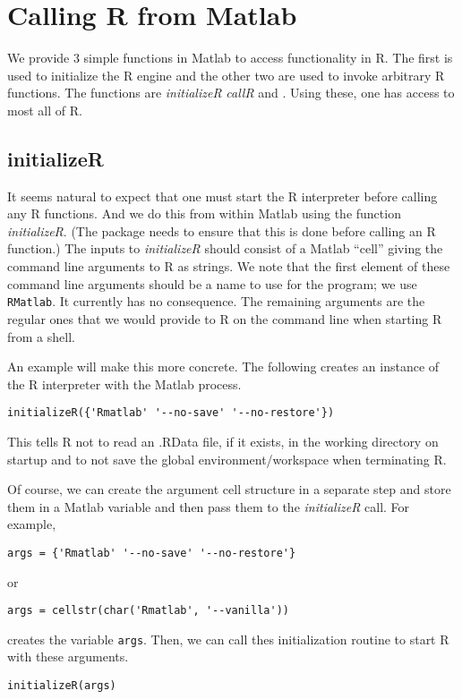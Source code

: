 \documentclass{article}
\def\MatlabFun#1{\textsl{#1}}
\begin{document}
\section{Calling R from Matlab}

We provide 3 simple functions in Matlab to access functionality in R.
The first is used to initialize the R engine and the other two are
used to invoke arbitrary R functions.  The functions are
\MatlabFun{initializeR} \MatlabFun{callR} and .
Using these, one has access to most all of R.

\subsection{initializeR}
It seems natural to expect that one must start the R interpreter
before calling any R functions.  And we do this from within Matlab
using the function \MatlabFun{initializeR}.  (The package needs to
ensure that this is done before calling an R function.)  The inputs to
\MatlabFun{initializeR} should consist of a Matlab ``cell'' giving the
command line arguments to R as strings.  We note that the first
element of these command line arguments should be a name to use for
the program; we use \texttt{RMatlab}. It currently has no consequence.
The remaining arguments are the regular ones that we would provide
to R on the command line when starting R from a shell. 

An example will make this more concrete.
The following creates an instance of the R interpreter
with the Matlab process.
\begin{verbatim}
initializeR({'Rmatlab' '--no-save' '--no-restore'})
\end{verbatim}
This tells R not to read an .RData file, if it exists, in the working
directory on startup and to not save the global environment/workspace
when terminating R.

Of course, we can create the argument cell structure in a separate
step and store them in a Matlab variable and then pass them to the
\MatlabFun{initializeR} call.  For example,
\begin{verbatim}
args = {'Rmatlab' '--no-save' '--no-restore'}
\end{verbatim}
or
\begin{verbatim}
args = cellstr(char('Rmatlab', '--vanilla'))
\end{verbatim}
creates the variable \texttt{args}.  Then, we can call thes
initialization routine to start R with these arguments.
\begin{verbatim}
initializeR(args)
\end{verbatim}
\end{document}
